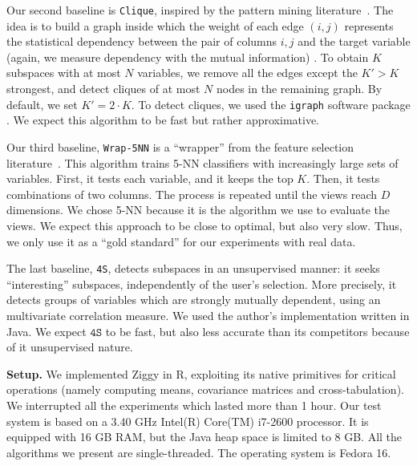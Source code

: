 Our second baseline is \texttt{Clique}, inspired by the pattern mining
literature~\cite{xie2010max}. The idea is to build a graph inside which the
weight of each edge $(i,j)$ represents the statistical dependency between the
pair of columns $i,j$ and the target variable (again, we measure dependency
with the mutual information) . To obtain $K$ subspaces with at most $N$
variables, we remove all the edges except the $K' > K$ strongest, and detect
cliques of at most $N$ nodes in the remaining graph. By default, we set $K' =
2\cdot K$. To detect cliques, we used the \texttt{igraph} software package . We
expect this algorithm to be fast but rather approximative.

Our third baseline, \texttt{Wrap-5NN} is a ``wrapper'' from the feature
selection literature~\cite{guyon2003introduction}. This algorithm trains 5-NN
classifiers with increasingly large sets of variables. First, it tests each
variable, and it keeps the top $K$. Then, it tests combinations of two columns.
The process is repeated until the views reach $D$ dimensions. We chose 5-NN
because it is the algorithm we use to evaluate the views. We expect this
approach to be close to optimal, but also very slow. Thus, we only use it as a
``gold standard'' for our experiments with real data.

The last baseline, \texttt{4S}, detects subspaces in an unsupervised manner: it
seeks ``interesting'' subspaces, independently of the user's selection. More
precisely, it detects groups of variables which are strongly mutually
dependent, using an multivariate correlation measure. We used
the author's implementation written in Java. We expect $\texttt{4S}$ to be
fast, but also less accurate than its competitors because of it unsupervised
nature.

\textbf{Setup.} We implemented Ziggy in R, exploiting its native primitives for critical
operations (namely computing means, covariance matrices and cross-tabulation).
We interrupted all the experiments which lasted more than 1 hour. Our test
system is based on a 3.40 GHz Intel(R) Core(TM) i7-2600 processor. It is
equipped with 16 GB RAM, but the Java heap space is limited to 8 GB. All the
algorithms we present are single-threaded. The operating system is Fedora 16.

